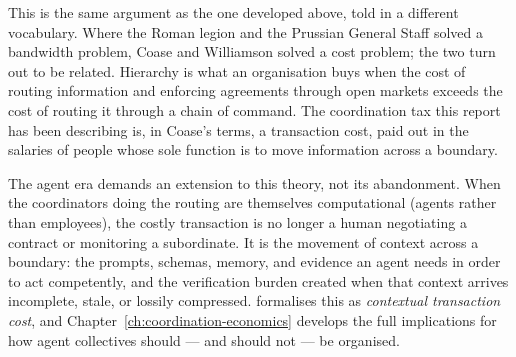 This is the same argument as the one developed above, told in a different vocabulary. Where the Roman legion and the Prussian General Staff solved a bandwidth problem, Coase and Williamson solved a cost problem; the two turn out to be related. Hierarchy is what an organisation buys when the cost of routing information and enforcing agreements through open markets exceeds the cost of routing it through a chain of command. The coordination tax this report has been describing is, in Coase's terms, a transaction cost, paid out in the salaries of people whose sole function is to move information across a boundary.

The agent era demands an extension to this theory, not its abandonment. When the coordinators doing the routing are themselves computational (agents rather than employees), the costly transaction is no longer a human negotiating a contract or monitoring a subordinate. It is the movement of context across a boundary: the prompts, schemas, memory, and evidence an agent needs in order to act competently, and the verification burden created when that context arrives incomplete, stale, or lossily compressed. \textcite{Liu2026} formalises this as \emph{contextual transaction cost}, and Chapter~\ref{ch:coordination-economics} develops the full implications for how agent collectives should --- and should not --- be organised.
